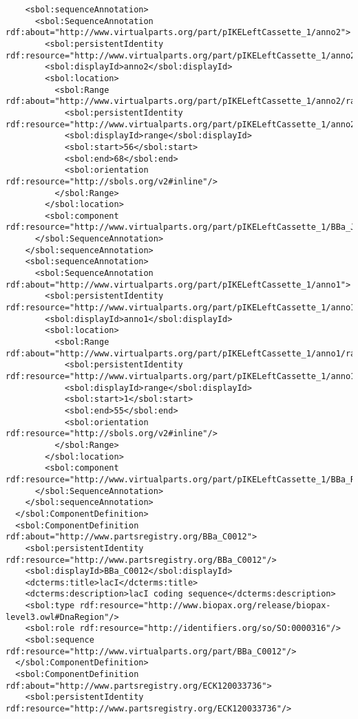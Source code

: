 \begin{lstlisting}
    <sbol:sequenceAnnotation>
      <sbol:SequenceAnnotation rdf:about="http://www.virtualparts.org/part/pIKELeftCassette_1/anno2">
        <sbol:persistentIdentity rdf:resource="http://www.virtualparts.org/part/pIKELeftCassette_1/anno2"/>
        <sbol:displayId>anno2</sbol:displayId>
        <sbol:location>
          <sbol:Range rdf:about="http://www.virtualparts.org/part/pIKELeftCassette_1/anno2/range">
            <sbol:persistentIdentity rdf:resource="http://www.virtualparts.org/part/pIKELeftCassette_1/anno2/range"/>
            <sbol:displayId>range</sbol:displayId>
            <sbol:start>56</sbol:start>
            <sbol:end>68</sbol:end>
            <sbol:orientation rdf:resource="http://sbols.org/v2#inline"/>
          </sbol:Range>
        </sbol:location>
        <sbol:component rdf:resource="http://www.virtualparts.org/part/pIKELeftCassette_1/BBa_J61101"/>
      </sbol:SequenceAnnotation>
    </sbol:sequenceAnnotation>
    <sbol:sequenceAnnotation>
      <sbol:SequenceAnnotation rdf:about="http://www.virtualparts.org/part/pIKELeftCassette_1/anno1">
        <sbol:persistentIdentity rdf:resource="http://www.virtualparts.org/part/pIKELeftCassette_1/anno1"/>
        <sbol:displayId>anno1</sbol:displayId>
        <sbol:location>
          <sbol:Range rdf:about="http://www.virtualparts.org/part/pIKELeftCassette_1/anno1/range">
            <sbol:persistentIdentity rdf:resource="http://www.virtualparts.org/part/pIKELeftCassette_1/anno1/range"/>
            <sbol:displayId>range</sbol:displayId>
            <sbol:start>1</sbol:start>
            <sbol:end>55</sbol:end>
            <sbol:orientation rdf:resource="http://sbols.org/v2#inline"/>
          </sbol:Range>
        </sbol:location>
        <sbol:component rdf:resource="http://www.virtualparts.org/part/pIKELeftCassette_1/BBa_R0040"/>
      </sbol:SequenceAnnotation>
    </sbol:sequenceAnnotation>
  </sbol:ComponentDefinition>
  <sbol:ComponentDefinition rdf:about="http://www.partsregistry.org/BBa_C0012">
    <sbol:persistentIdentity rdf:resource="http://www.partsregistry.org/BBa_C0012"/>
    <sbol:displayId>BBa_C0012</sbol:displayId>
    <dcterms:title>lacI</dcterms:title>
    <dcterms:description>lacI coding sequence</dcterms:description>
    <sbol:type rdf:resource="http://www.biopax.org/release/biopax-level3.owl#DnaRegion"/>
    <sbol:role rdf:resource="http://identifiers.org/so/SO:0000316"/>
    <sbol:sequence rdf:resource="http://www.virtualparts.org/part/BBa_C0012"/>
  </sbol:ComponentDefinition>
  <sbol:ComponentDefinition rdf:about="http://www.partsregistry.org/ECK120033736">
    <sbol:persistentIdentity rdf:resource="http://www.partsregistry.org/ECK120033736"/>

\end{lstlisting}
